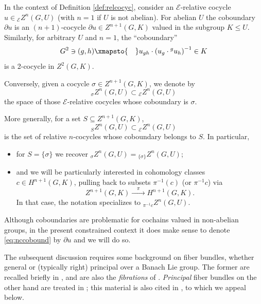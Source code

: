\documentclass[10pt,a4paper]{amsart}
\numberwithin{equation}{section}
\newcommand\cE{{\mathcal E}}
\begin{document}
\begin{Notation}\label{not:relsigma}
 In the context of Definition \ref{def:relcocyc}, consider an $\cE$-relative cocycle $u\in {}_{\cE}Z^n(G,U)$ (with $n=1$ if $U$ is not abelian). For abelian $U$ the coboundary $\partial u$ is an $(n+1)$-cocycle $ \partial u\in Z^{n+1}(G,K)$ valued in the subgroup $K\le U$. Similarly, for arbitrary $U$ and $n=1$, the ``coboundary''
 \begin{equation}\label{eq:nccobound}
 G^2\ni (g,h)\xmapsto{\quad} u_{gh}\cdot \left(u_g\cdot {}^g u_h\right)^{-1}\in K
 \end{equation}
 is a 2-cocycle in $Z^2(G,K)$.

 Conversely, given a cocycle $\sigma\in Z^{n+1}(G,K)$, we denote by
 \begin{equation*}
 {}_{\sigma}Z^{n}(G,U)\subset {}_{\cE}Z^n(G,U)
 \end{equation*}
 the space of those $\cE$-relative cocycles whose coboundary is $\sigma$.

 More generally, for a set $S\subseteq Z^{n+1}(G,K)$,
 \begin{equation*}
 {}_{S}Z^{n}(G,U)\subset {}_{\cE}Z^n(G,U)
 \end{equation*}
 is the set of relative $n$-cocycles whose coboundary belongs to $S$. In particular,
 \begin{itemize}\itemsep=0pt
 \item for $S=\{\sigma\}$ we recover ${}_{\sigma}Z^{n}(G,U)
 =
 {}_{\{\sigma\}}Z^{n}(G,U)$;
 \item and we will be particularly interested in cohomology classes $c\in H^{n+1}(G,K)$, pulling back to subsets $\pi^{-1}(c)$ \big(or $\pi^{-1}c$\big) via
 \begin{equation*}
 Z^{n+1}(G,K)\xrightarrow{\quad\pi\quad}H^{n+1}(G,K).
 \end{equation*}
 In that case, the notation specializes to ${}_{\pi^{-1}c}Z^{n}(G,U)$.
 \end{itemize}
\end{Notation}

\begin{Remark}\label{re:nccobound}
 Although coboundaries are problematic for cochains valued in non-abelian groups, in the present constrained context it does make sense to denote \eqref{eq:nccobound} by $\partial u$ and we will do so.
\end{Remark}

The subsequent discussion requires some background on fiber bundles, whether general or (typically right) principal over a Banach Lie group. The former are recalled briefly in \cite[Section~IV.3]{lang-fund}, and are also the {\it fibrations} of \cite[Section~6.1]{bourb-vars-17}. {\it Principal} fiber bundles on the other hand are treated in \cite[Section~6.2]{bourb-vars-17}; this material is also cited in \cite[Section~III.1]{bourb-lie-13}, to which we appeal below.
\end{document}

